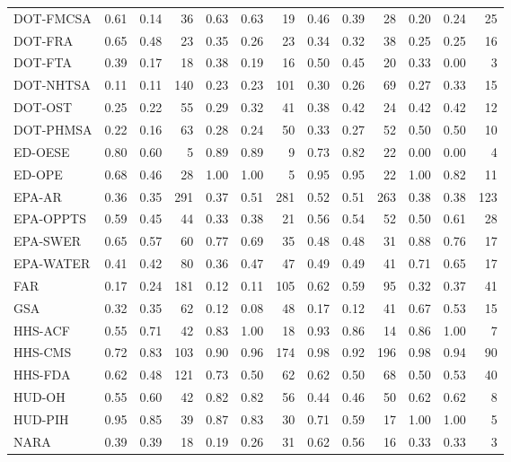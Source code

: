 \begin{table}[ht]
\begin{tabular}{lrrrrrrrrrrrr}
  DOT-FMCSA & 0.61 & 0.14 &  36 & 0.63 & 0.63 &  19 & 0.46 & 0.39 &  28 & 0.20 & 0.24 &  25 \\ 
  DOT-FRA & 0.65 & 0.48 &  23 & 0.35 & 0.26 &  23 & 0.34 & 0.32 &  38 & 0.25 & 0.25 &  16 \\ 
  DOT-FTA & 0.39 & 0.17 &  18 & 0.38 & 0.19 &  16 & 0.50 & 0.45 &  20 & 0.33 & 0.00 &   3 \\ 
  DOT-NHTSA & 0.11 & 0.11 & 140 & 0.23 & 0.23 & 101 & 0.30 & 0.26 &  69 & 0.27 & 0.33 &  15 \\ 
  DOT-OST & 0.25 & 0.22 &  55 & 0.29 & 0.32 &  41 & 0.38 & 0.42 &  24 & 0.42 & 0.42 &  12 \\ 
  DOT-PHMSA & 0.22 & 0.16 &  63 & 0.28 & 0.24 &  50 & 0.33 & 0.27 &  52 & 0.50 & 0.50 &  10 \\ 
  ED-OESE & 0.80 & 0.60 &   5 & 0.89 & 0.89 &   9 & 0.73 & 0.82 &  22 & 0.00 & 0.00 &   4 \\ 
  ED-OPE & 0.68 & 0.46 &  28 & 1.00 & 1.00 &   5 & 0.95 & 0.95 &  22 & 1.00 & 0.82 &  11 \\ 
  EPA-AR & 0.36 & 0.35 & 291 & 0.37 & 0.51 & 281 & 0.52 & 0.51 & 263 & 0.38 & 0.38 & 123 \\ 
  EPA-OPPTS & 0.59 & 0.45 &  44 & 0.33 & 0.38 &  21 & 0.56 & 0.54 &  52 & 0.50 & 0.61 &  28 \\ 
  EPA-SWER & 0.65 & 0.57 &  60 & 0.77 & 0.69 &  35 & 0.48 & 0.48 &  31 & 0.88 & 0.76 &  17 \\ 
  EPA-WATER & 0.41 & 0.42 &  80 & 0.36 & 0.47 &  47 & 0.49 & 0.49 &  41 & 0.71 & 0.65 &  17 \\ 
  FAR & 0.17 & 0.24 & 181 & 0.12 & 0.11 & 105 & 0.62 & 0.59 &  95 & 0.32 & 0.37 &  41 \\ 
  GSA & 0.32 & 0.35 &  62 & 0.12 & 0.08 &  48 & 0.17 & 0.12 &  41 & 0.67 & 0.53 &  15 \\ 
  HHS-ACF & 0.55 & 0.71 &  42 & 0.83 & 1.00 &  18 & 0.93 & 0.86 &  14 & 0.86 & 1.00 &   7 \\ 
  HHS-CMS & 0.72 & 0.83 & 103 & 0.90 & 0.96 & 174 & 0.98 & 0.92 & 196 & 0.98 & 0.94 &  90 \\ 
  HHS-FDA & 0.62 & 0.48 & 121 & 0.73 & 0.50 &  62 & 0.62 & 0.50 &  68 & 0.50 & 0.53 &  40 \\ 
  HUD-OH & 0.55 & 0.60 &  42 & 0.82 & 0.82 &  56 & 0.44 & 0.46 &  50 & 0.62 & 0.62 &   8 \\ 
  HUD-PIH & 0.95 & 0.85 &  39 & 0.87 & 0.83 &  30 & 0.71 & 0.59 &  17 & 1.00 & 1.00 &   5 \\ 
  NARA & 0.39 & 0.39 &  18 & 0.19 & 0.26 &  31 & 0.62 & 0.56 &  16 & 0.33 & 0.33 &   3 \\ 

\end{tabular}
\end{table}
